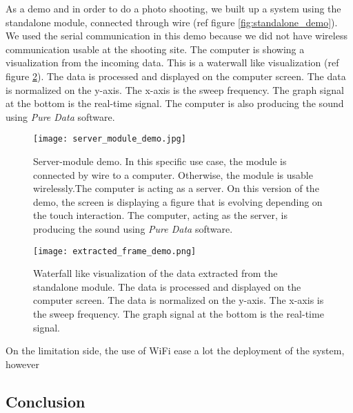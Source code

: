 As a demo and in order to do a photo shooting, we built up a system using the standalone module, connected through wire (ref figure \ref{fig:standalone_demo}). We used the serial communication in this demo because we did not have wireless communication usable at the shooting site. The computer is showing a visualization from the incoming data. This is a waterwall like visualization (ref figure \ref{fig:extracted_frame_demo}). The data is processed and displayed on the computer screen. The data is normalized on the y-axis. The x-axis is the sweep frequency. The graph signal at the bottom is the real-time signal. The computer is also producing the sound using \textit{Pure Data} software.

\begin{figure}[h!]
    \centering
    \texttt{[image: server\_module\_demo.jpg]}
    \caption{Server-module demo. In this specific use case, the module is connected by wire to a computer. Otherwise, the module is usable wirelessly.The computer is acting as a server. On this version of the demo, the screen is displaying a figure that is evolving depending on the touch interaction. The computer, acting as the server, is producing the sound using \textit{Pure Data} software.}
    \vspace{0.1cm}
    \label{fig:server_module_demo}
\end{figure}

\begin{figure}[h!]
    \centering
    \texttt{[image: extracted\_frame\_demo.png]}
    \caption{Waterfall like visualization of the data extracted from the standalone module. The data is processed and displayed on the computer screen. The data is normalized on the y-axis. The x-axis is the sweep frequency. The graph signal at the bottom is the real-time signal.}
    \vspace{0.1cm}
    \label{fig:extracted_frame_demo}
\end{figure}

On the limitation side, the use of WiFi ease a lot the deployment of the system, however

\subsection{Conclusion}

